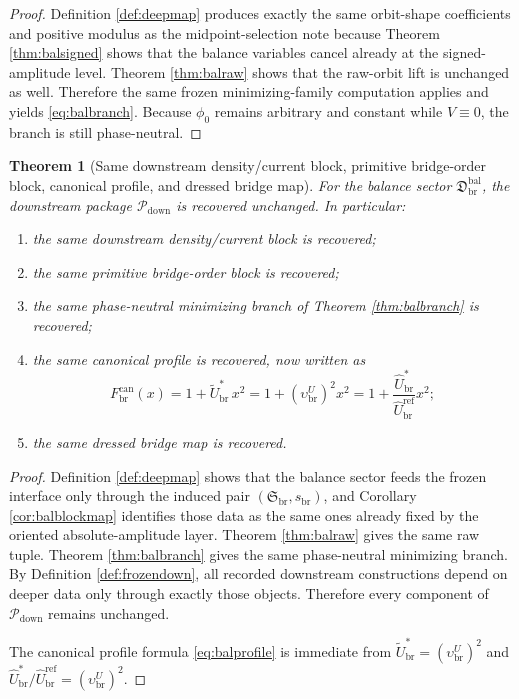 \documentclass[11pt]{article}
\newcommand{\RespShapeEq}{\widetilde U_{\mathrm{br}}^{\ast}}
\newcommand{\RespRawRef}{\widehat U_{\mathrm{br}}^{\mathrm{ref}}}
\newcommand{\RespRawEq}{\widehat U_{\mathrm{br}}^{\ast}}
\newcommand{\CurvProfileCan}{F_{\mathrm{br}}^{\mathrm{can}}}
\newcommand{\DownPkg}{\mathscr P_{\mathrm{down}}}
\newcommand{\ShapeTuple}{\mathfrak S_{\mathrm{br}}}
\newcommand{\ScaleMod}{s_{\mathrm{br}}}
\newcommand{\AbsEqAmp}{\upsilon_{\mathrm{br}}^{U}}
\newcommand{\MidBalanceSector}{\mathfrak D_{\mathrm{br}}^{\mathrm{bal}}}
\newtheorem{theorem}{Theorem}
\begin{document}
\begin{proof}
Definition \ref{def:deepmap} produces exactly the same orbit-shape coefficients and positive modulus as the midpoint-selection note because Theorem \ref{thm:balsigned} shows that the balance variables cancel already at the signed-amplitude level. Theorem \ref{thm:balraw} shows that the raw-orbit lift is unchanged as well. Therefore the same frozen minimizing-family computation applies and yields \eqref{eq:balbranch}. Because \(\phi_{0}\) remains arbitrary and constant while \(V\equiv0\), the branch is still phase-neutral.
\end{proof}

\begin{theorem}[Same downstream density/current block, primitive bridge-order block, canonical profile, and dressed bridge map]
\label{thm:baldownstream}
For the balance sector \(\MidBalanceSector\), the downstream package \(\DownPkg\) is recovered unchanged. In particular:
\begin{enumerate}
    \item the same downstream density/current block is recovered;
    \item the same primitive bridge-order block is recovered;
    \item the same phase-neutral minimizing branch of Theorem \ref{thm:balbranch} is recovered;
    \item the same canonical profile is recovered, now written as
    \begin{equation}
    \CurvProfileCan(x)
    =
    1+\RespShapeEq\,x^{2}
    =
    1+(\AbsEqAmp)^{2}x^{2}
    =
    1+\frac{\RespRawEq}{\RespRawRef}x^{2};
    \label{eq:balprofile}
    \end{equation}
    \item the same dressed bridge map is recovered.
\end{enumerate}
\end{theorem}

\begin{proof}
Definition \ref{def:deepmap} shows that the balance sector feeds the frozen interface only through the induced pair \((\ShapeTuple,\ScaleMod)\), and Corollary \ref{cor:balblockmap} identifies those data as the same ones already fixed by the oriented absolute-amplitude layer. Theorem \ref{thm:balraw} gives the same raw tuple. Theorem \ref{thm:balbranch} gives the same phase-neutral minimizing branch. By Definition \ref{def:frozendown}, all recorded downstream constructions depend on deeper data only through exactly those objects. Therefore every component of \(\DownPkg\) remains unchanged.

The canonical profile formula \eqref{eq:balprofile} is immediate from \(\RespShapeEq=(\AbsEqAmp)^{2}\) and \(\RespRawEq/\RespRawRef=(\AbsEqAmp)^{2}\).
\end{proof}
\end{document}
